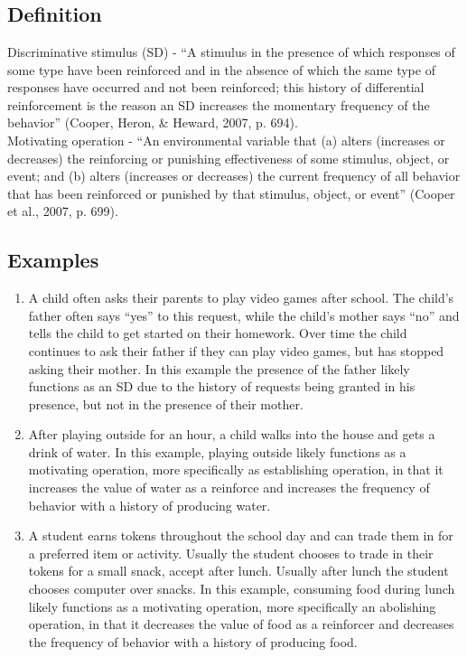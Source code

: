 \clearpage \section[\fourFKTwentyNine{}]{\fourFKTwentyNine{}%
              }
\subsection{Definition}
Discriminative stimulus (SD) - ``A stimulus in the presence of which responses of some type have been reinforced and in the absence of which the same type of responses have occurred and not been reinforced; this history of differential reinforcement is the reason an SD increases the momentary frequency of the behavior'' (Cooper, Heron, \& Heward, 2007, p. 694).\\

Motivating operation - ``An environmental variable that (a) alters (increases or decreases) the reinforcing or punishing effectiveness of some stimulus, object, or event; and (b) alters (increases or decreases) the current frequency of all behavior that has been reinforced or punished by that stimulus, object, or event'' (Cooper et al., 2007, p. 699).\\
%
\subsection{Examples}
\begin{enumerate}
\item A child often asks their parents to play video games after school. The child's father often says ``yes'' to this request, while the child's mother says ``no'' and tells the child to get started on their homework. Over time the child continues to ask their father if they can play video games, but has stopped asking their mother. In this example the presence of the father likely functions as an SD due to the history of requests being granted in his presence, but not in the presence of their mother.
\item After playing outside for an hour, a child walks into the house and gets a drink of water. In this example, playing outside likely functions as a motivating operation, more specifically as establishing operation, in that it increases the value of water as a reinforce and increases the frequency of behavior with a history of producing water.
\item A student earns tokens throughout the school day and can trade them in for a preferred item or activity. Usually the student chooses to trade in their tokens for a small snack, accept after lunch. Usually after lunch the student chooses computer over snacks. In this example, consuming food during lunch likely functions as a motivating operation, more specifically an abolishing operation, in that it decreases the value of food as a reinforcer and decreases the frequency of behavior with a history of producing food.
%
\end{enumerate}
%
